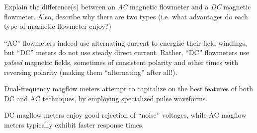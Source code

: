 

Explain the difference(s) between an {\it AC} magnetic flowmeter and a {\it DC} magnetic flowmeter.  Also, describe why there are two types (i.e. what advantages do each type of magnetic flowmeter enjoy?)







``AC'' flowmeters indeed use alternating current to energize their field windings, but ``DC'' meters do not use steady direct current.  Rather, ``DC'' flowmeters use {\it pulsed} magnetic fields, sometimes of consistent polarity and other times with reversing polarity (making them ``alternating'' after all!).

Dual-frequency magflow meters attempt to capitalize on the best features of both DC and AC techniques, by employing specialized pulse waveforms.

\vskip 10pt

DC magflow meters enjoy good rejection of ``noise'' voltages, while AC magflow meters typically exhibit faster response times.










